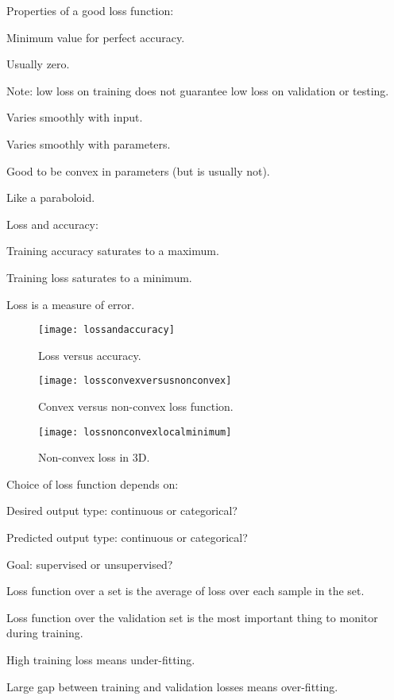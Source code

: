 Properties of a good loss function:
	\begin{bulletedlist}
		\item Minimum value for perfect accuracy.
		\begin{bulletedlist}
			\item Usually zero.
			\item Note: low loss on training does not guarantee low loss on validation or testing.
		\end{bulletedlist}
		\item Varies smoothly with input.
		\item Varies smoothly with parameters.
		\item Good to be convex in parameters (but is usually not).
		\begin{bulletedlist}
			\item Like a paraboloid.
		\end{bulletedlist}
	\end{bulletedlist}

Loss and accuracy:
	\begin{bulletedlist}
		\item Training accuracy saturates to a maximum.
		\item Training loss saturates to a minimum.
		\item Loss is a measure of error.
	\end{bulletedlist}
 	\begin{figure}[htb]
		\centering
		\texttt{[image: lossandaccuracy]}
		\caption[Loss versus accuracy]{Loss versus accuracy.}
		\label{fig:lossandaccuracy}
	\end{figure}
 	\begin{figure}[htb]
		\centering
		\texttt{[image: lossconvexversusnonconvex]}
		\caption[Convex versus non-convex loss function]{Convex versus non-convex loss function.}
		\label{fig:lossconvexversusnonconvex}
	\end{figure}
 	\begin{figure}[htb]
		\centering
		\texttt{[image: lossnonconvexlocalminimum]}
		\caption[Non-convex loss in 3D]{Non-convex loss in 3D.}
		\label{fig:lossnonconvexlocalminimum}
	\end{figure}



Choice of loss function depends on:
	\begin{bulletedlist}
		\item Desired output type: continuous or categorical?
		\item Predicted output type: continuous or categorical?
		\item Goal: supervised or unsupervised?
		\item Loss function over a set is the average of loss over each sample in the set.
		\item Loss function over the validation set is the most important thing to monitor during training.
		\item High training loss means under-fitting.
		\item Large gap between training and validation losses means over-fitting.
	\end{bulletedlist}

